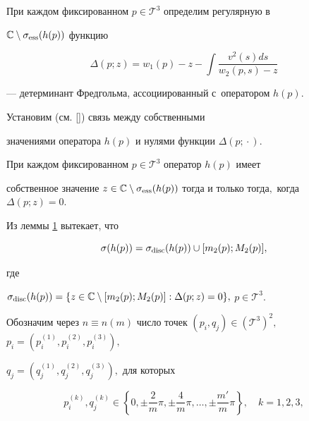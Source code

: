 \smallskip



При каждом фиксированном $p\in {\mathcal T}^3$ определим регулярную в

${\mathbb C}\setminus \sigma_{\rm ess}(h(p))$ функцию 

$$

\Delta(p; z)=w_1(p)-z-\int \frac{ v^2(s)ds}{w_2(p,s)-z}

$$

--- детерминант Фредгольма, ассоциированный с~оператором $h(p)$.

Установим (см. []) связь между собственными

значениями оператора $h(p)$ и нулями функции $\Delta(p; {}\cdot{}).$

\smallskip\hypertarget{ras-lem:1}{}

\begin{lemma}[1]При каждом фиксированном $p\in {\mathcal T}^3$ оператор $h(p)$ имеет

собственное значение $z\in {\mathbb C} \setminus \sigma_{\rm ess}

(h(p))$ тогда и только тогда$,$ когда $ \Delta(p; z)=0.$

\end{lemma}



\smallskip



Из леммы \hyperlink{ras-lem:1}{1} вытекает, что

$$

\sigma(h(p))=\sigma_{\rm disc}(h(p))\cup [m_2(p); M_2(p)],

$$

где

$

\sigma_{\rm disc}(h(p))=\{z\in {\mathbb C} \setminus [m_2(p); M_2(p)]: \Delta(p; z)=0\},$ $p\in {\mathcal T}^3. $



Обозначим через $n\equiv n(m)$ число точек $(p_i, q_j) \in ({\mathcal T}^3)^2,$  $p_i=(p_i^{(1)}, p_i^{(2)}, p_i^{(3)}),$

$q_j=(q_j^{(1)}, q_j^{(2)}, q_j^{(3)}),$ для которых

$$

p_i^{(k)}, q_j^{(k)} \in \left\{0, \pm \frac{2}{m} \pi, \pm \frac{4}{m} \pi, \dots, \pm \frac{m'}{m} \pi \right\},\quad

k=1, 2, 3,

$$

